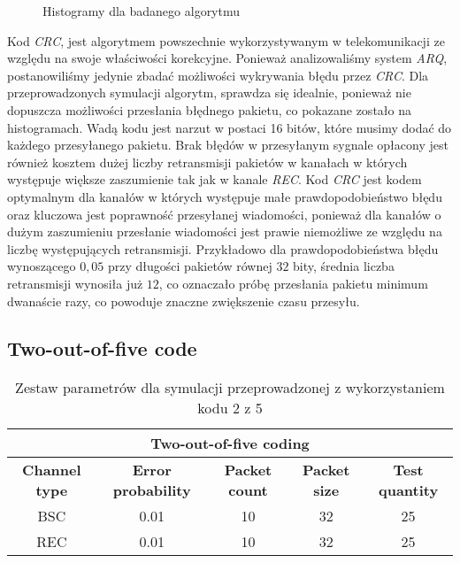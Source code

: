 \documentclass{article}
\begin{document}
\newpage

\begin{figure}[h!]
\centering
{}
\qquad 
{}
\caption{Histogramy dla badanego algorytmu}
\end{figure}

Kod \textit{CRC}, jest algorytmem powszechnie wykorzystywanym w telekomunikacji ze względu na swoje właściwości korekcyjne. Ponieważ analizowaliśmy system \textit{ARQ}, postanowiliśmy jedynie zbadać możliwości wykrywania błędu przez \textit{CRC}. Dla przeprowadzonych symulacji algorytm, sprawdza się idealnie, ponieważ nie dopuszcza możliwości przesłania błędnego pakietu, co pokazane zostało na histogramach. Wadą kodu jest narzut w postaci 16 bitów, które musimy dodać do każdego przesyłanego pakietu. Brak błędów w przesyłanym sygnale opłacony jest również kosztem dużej liczby retransmisji pakietów w kanałach w których występuje większe zaszumienie tak jak w kanale \textit{REC}. Kod \textit{CRC} jest kodem optymalnym dla kanałów w których występuje małe prawdopodobieństwo błędu oraz kluczowa jest poprawność przesyłanej wiadomości, ponieważ dla kanałów o dużym zaszumieniu przesłanie wiadomości jest prawie niemożliwe ze względu na liczbę występujących retransmisji. Przykładowo dla prawdopodobieństwa błędu wynoszącego $0,05$ przy długości pakietów równej $32$ bity, średnia liczba retransmisji wynosiła już $12$, co oznaczało próbę przesłania pakietu minimum dwanaście razy, co powoduje znaczne zwiększenie czasu przesyłu.

\subsection{Two-out-of-five code}

\begin{table}[htbp!]
\begin{tabular}{|c|c|c|c|c|}
\hline
\multicolumn{5}{|c|}{\textbf{Two-out-of-five coding}}                                                                                  \\ \hline
\textbf{Channel type} & \textbf{Error probability} & \textbf{Packet count} & \textbf{Packet size} & \textbf{Test quantity} \\ \hline
BSC                   & 0.01                      & 10                    & 32                   & 25                     \\ \hline
REC                   & 0.01                       & 10                    & 32                   & 25                     \\ \hline
\end{tabular}
\caption{Zestaw parametrów dla symulacji przeprowadzonej z wykorzystaniem kodu 2 z 5}
\end{table}
\end{document}
